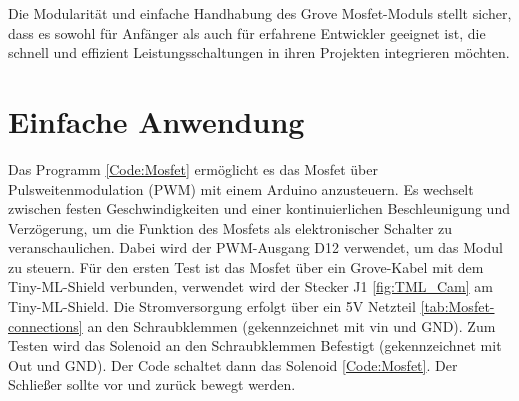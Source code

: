 Die Modularität und einfache Handhabung des Grove Mosfet-Moduls stellt sicher, dass es sowohl für Anfänger als auch für erfahrene Entwickler geeignet ist, die schnell und effizient Leistungsschaltungen in ihren Projekten integrieren möchten.\cite{GroveMOSFETDocs}

\section{Einfache Anwendung} \label{Test:Mosfet Solenoid}
Das Programm \ref{Code:Mosfet} ermöglicht es das Mosfet über Pulsweitenmodulation (PWM) mit einem Arduino anzusteuern. Es wechselt zwischen festen Geschwindigkeiten und einer kontinuierlichen Beschleunigung und Verzögerung, um die Funktion des Mosfets als elektronischer Schalter zu veranschaulichen. Dabei wird der PWM-Ausgang D12 verwendet, um das Modul zu steuern. Für den ersten Test ist das Mosfet über ein Grove-Kabel mit dem Tiny-ML-Shield verbunden, verwendet wird der Stecker J1 \ref{fig:TML_Cam} am Tiny-ML-Shield. Die Stromversorgung erfolgt über ein 5V Netzteil \ref{tab:Mosfet-connections} an den Schraubklemmen (gekennzeichnet mit \ac{vin} und GND). Zum Testen wird das Solenoid an den Schraubklemmen Befestigt (gekennzeichnet mit Out und GND). Der Code schaltet dann das Solenoid \ref{Code:Mosfet}. Der Schließer sollte vor und zurück bewegt werden.



